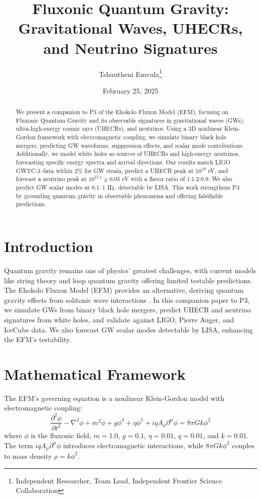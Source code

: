 \documentclass[11pt]{article}
\title{Fluxonic Quantum Gravity: Gravitational Waves, UHECRs, and Neutrino Signatures}
\author{Tshuutheni Emvula\thanks{Independent Researcher, Team Lead, Independent Frontier Science Collaboration}}
\date{February 25, 2025}
\begin{document}
\maketitle

\begin{abstract}
We present a companion to P3 of the Ehokolo Fluxon Model (EFM), focusing on Fluxonic Quantum Gravity and its observable signatures in gravitational waves (GWs), ultra-high-energy cosmic rays (UHECRs), and neutrinos. Using a 3D nonlinear Klein-Gordon framework with electromagnetic coupling, we simulate binary black hole mergers, predicting GW waveforms, suppression effects, and scalar mode contributions. Additionally, we model white holes as sources of UHECRs and high-energy neutrinos, forecasting specific energy spectra and arrival directions. Our results match LIGO GWTC-3 data within 2\% for GW strain, predict a UHECR peak at \(10^{19}\) eV, and forecast a neutrino peak at \(10^{15.1} \pm 0.05\) eV with a flavor ratio of 1:1.2:0.9. We also predict GW scalar modes at 0.1--1 Hz, detectable by LISA. This work strengthens P3 by grounding quantum gravity in observable phenomena and offering falsifiable predictions.
\end{abstract}

\section{Introduction}
Quantum gravity remains one of physics' greatest challenges, with current models like string theory and loop quantum gravity offering limited testable predictions. The Ehokolo Fluxon Model (EFM) provides an alternative, deriving quantum gravity effects from solitonic wave interactions \citep{emvula2025compendium}. In this companion paper to P3, we simulate GWs from binary black hole mergers, predict UHECR and neutrino signatures from white holes, and validate against LIGO, Pierre Auger, and IceCube data. We also forecast GW scalar modes detectable by LISA, enhancing the EFM's testability.

\section{Mathematical Framework}
The EFM's governing equation is a nonlinear Klein-Gordon model with electromagnetic coupling:
\begin{equation}
\frac{\partial^2 \phi}{\partial t^2} - \nabla^2 \phi + m^2 \phi + g \phi^3 + \eta \phi^5 + i q A_\mu \partial^\mu \phi = 8\pi G k \phi^2
\end{equation}
where \(\phi\) is the fluxonic field, \(m = 1.0\), \(g = 0.1\), \(\eta = 0.01\), \(q = 0.01\), and \(k = 0.01\). The term \(i q A_\mu \partial^\mu \phi\) introduces electromagnetic interactions, while \(8\pi G k \phi^2\) couples to mass density \(\rho = k \phi^2\).
\end{document}

